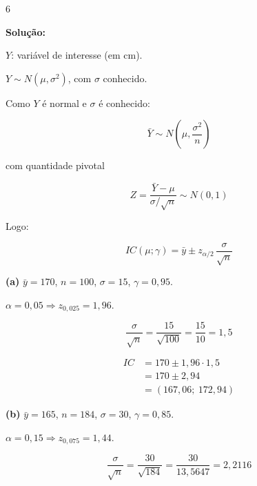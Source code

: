 \documentclass[8pt, a4paper, landscape]{extarticle}
\begin{document}
\begin{multicols}{6}
\vspace{0.3cm}

\textbf{Solução:}

$Y$: variável de interesse (em cm).

$Y \sim N(\mu, \sigma^2)$, com $\sigma$ conhecido.

Como $Y$ é normal e $\sigma$ é conhecido:

\begin{equation*}
\bar{Y} \sim N\left(\mu, \frac{\sigma^2}{n}\right)
\end{equation*}

com quantidade pivotal

\begin{equation*}
Z = \frac{\bar{Y} - \mu}{\sigma/\sqrt{n}} \sim N(0,1)
\end{equation*}

Logo:

\begin{equation*}
IC(\mu;\gamma) = \bar{y} \pm z_{\alpha/2}\,\frac{\sigma}{\sqrt{n}}
\end{equation*}

\vspace{0.2cm}

\textbf{(a)} $\bar{y} = 170$, $n = 100$, $\sigma = 15$, $\gamma = 0,95$.

$\alpha = 0,05 \Rightarrow z_{0,025} = 1,96$.

\begin{equation*}
\frac{\sigma}{\sqrt{n}} = \frac{15}{\sqrt{100}} = \frac{15}{10} = 1,5
\end{equation*}

\begin{equation*}
\begin{split}
IC &= 170 \pm 1,96 \cdot 1,5 \\
&= 170 \pm 2,94 \\
&= (167,06;\ 172,94)
\end{split}
\end{equation*}

\vspace{0.2cm}

\textbf{(b)} $\bar{y} = 165$, $n = 184$, $\sigma = 30$, $\gamma = 0,85$.

$\alpha = 0,15 \Rightarrow z_{0,075} = 1,44$.

\begin{equation*}
\frac{\sigma}{\sqrt{n}} = \frac{30}{\sqrt{184}} = \frac{30}{13,5647} = 2,2116
\end{equation*}


\end{multicols}
\end{document}

